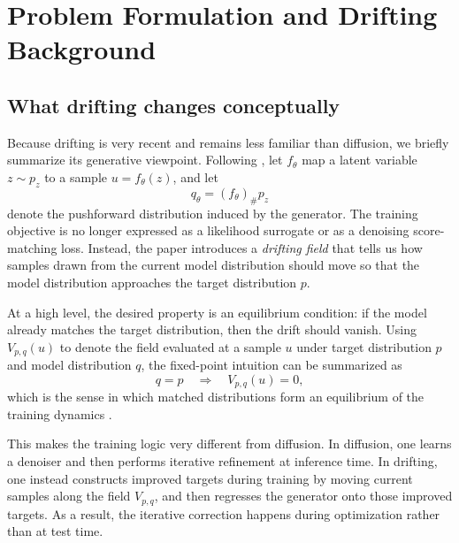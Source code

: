 \documentclass[conference]{IEEEtran}
\begin{document}
\section{Problem Formulation and Drifting Background}
\subsection{What drifting changes conceptually}
Because drifting is very recent and remains less familiar than diffusion, we briefly summarize its generative viewpoint.
Following \cite{drifting}, let \(f_\theta\) map a latent variable \(z \sim p_z\) to a sample \(u = f_\theta(z)\), and let
\begin{equation}
q_\theta = (f_\theta)_\# p_z
\end{equation}
denote the pushforward distribution induced by the generator.
The training objective is no longer expressed as a likelihood surrogate or as a denoising score-matching loss.
Instead, the paper introduces a \emph{drifting field} that tells us how samples drawn from the current model distribution should move so that the model distribution approaches the target distribution \(p\).

At a high level, the desired property is an equilibrium condition:
if the model already matches the target distribution, then the drift should vanish.
Using \(V_{p,q}(u)\) to denote the field evaluated at a sample \(u\) under target distribution \(p\) and model distribution \(q\), the fixed-point intuition can be summarized as
\begin{equation}
q = p
\quad \Longrightarrow \quad
V_{p,q}(u) = 0,
\end{equation}
which is the sense in which matched distributions form an equilibrium of the training dynamics \cite{drifting,driftingproj}.

This makes the training logic very different from diffusion.
In diffusion, one learns a denoiser and then performs iterative refinement at inference time.
In drifting, one instead constructs improved targets during training by moving current samples along the field \(V_{p,q}\), and then regresses the generator onto those improved targets.
As a result, the iterative correction happens during optimization rather than at test time.
\end{document}
